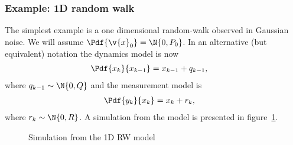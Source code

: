 \subsubsection*{Example: 1D random walk}
The simplest example is a one dimensional random-walk observed in Gaussian noise.
We will assume $\Pdf{\v{x}_0}=\N{0,P_0}$. In an alternative (but equivalent) notation
the dynamics model is now
\begin{align}
	\Pdf{x_k}{x_{k-1}}&=x_{k-1}+q_{k-1},
\end{align}
where $q_{k-1}\sim \N{0,Q}$ and the measurement model is
\begin{align}
	\Pdf{y_k}{x_{k}}&=x_{k}+r_{k},
\end{align}
where $r_{k}\sim \N{0,R}$. A simulation from the model is presented in figure~\ref{fig:rw1d}.

\begin{figure}[htp]
\begin{center}
  \caption{Simulation from the 1D RW model}
  \label{fig:rw1d}
\end{center}
\end{figure}


